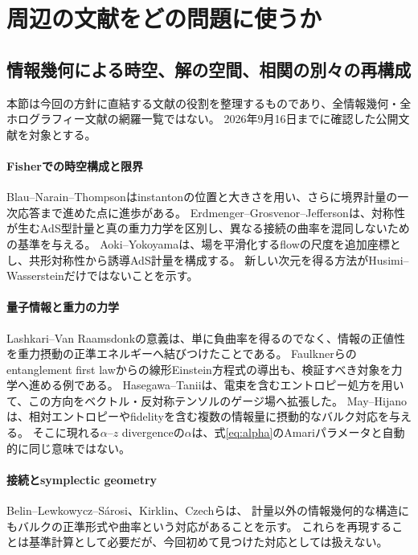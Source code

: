 \documentclass[a4paper,11pt]{ltjsarticle}
\numberwithin{equation}{section}
\begin{document}
\section{周辺の文献をどの問題に使うか}
\subsection{情報幾何による時空、解の空間、相関の別々の再構成}
本節は今回の方針に直結する文献の役割を整理するものであり、全情報幾何・全ホログラフィー文献の網羅一覧ではない。
2026年9月16日までに確認した公開文献を対象とする。

\paragraph{Fisherでの時空構成と限界}
Blau--Narain--Thompson\cite{BNT}はinstantonの位置と大きさを用い、さらに境界計量の一次応答まで進めた点に進歩がある。
Erdmenger--Grosvenor--Jefferson\cite{EGJ}は、対称性が生むAdS型計量と真の重力力学を区別し、異なる接続の曲率を混同しないための基準を与える。
Aoki--Yokoyama\cite{Aoki}は、場を平滑化するflowの尺度を追加座標とし、共形対称性から誘導AdS計量を構成する。
新しい次元を得る方法がHusimi--Wassersteinだけではないことを示す。

\paragraph{量子情報と重力の力学}
Lashkari--Van Raamsdonk\cite{LVR}の意義は、単に負曲率を得るのでなく、情報の正値性を重力摂動の正準エネルギーへ結びつけたことである。
Faulknerら\cite{FLMVR}のentanglement first lawからの線形Einstein方程式の導出も、検証すべき対象を力学へ進める例である。
Hasegawa--Tanii\cite{HasegawaTanii}は、電束を含むエントロピー処方を用いて、この方向をベクトル・反対称テンソルのゲージ場へ拡張した。
May--Hijano\cite{Zoo}は、相対エントロピーやfidelityを含む複数の情報量に摂動的なバルク対応を与える。
そこに現れる$\alpha$--$z$ divergenceの$\alpha$は、式\eqref{eq:alpha}のAmariパラメータと自動的に同じ意味ではない。

\paragraph{接続とsymplectic geometry}
Belin--Lewkowycz--S\'arosi\cite{BLS}、Kirklin\cite{Kirklin}、Czechら\cite{Modular,Sewing,Changing}は、
計量以外の情報幾何的な構造にもバルクの正準形式や曲率という対応があることを示す。
これらを再現することは基準計算として必要だが、今回初めて見つけた対応としては扱えない。
\end{document}
